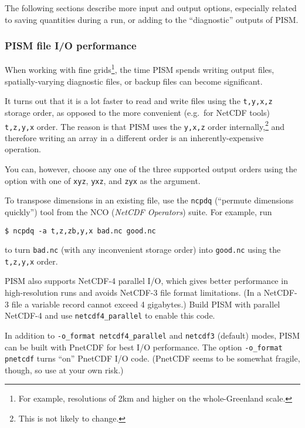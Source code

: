 The following sections describe more input and output options, especially related to saving quantities during a run, or adding to the ``diagnostic'' outputs of PISM.

\clearpage

\subsubsection{PISM file I/O performance}
\label{sec:pism-io-performance}

When working with fine grids\footnote{For example, resolutions of 2km and higher on the whole-Greenland scale.}, the time PISM spends writing output files, spatially-varying diagnostic files, or backup files can become significant.

It turns out that it is a lot faster to read and write files using the \texttt{t,y,x,z} storage order, as opposed to the more convenient (e.g.~for NetCDF tools) \texttt{t,z,y,x} order.  The reason is that PISM uses the \texttt{y,x,z} order internally,\footnote{This is not likely to change.} and therefore writing an array in a different order is an inherently-expensive operation.

You can, however, choose any one of the three supported output orders using the  option with one of \texttt{xyz}, \texttt{yxz}, and \texttt{zyx} as the argument.

To transpose dimensions in an existing file, use the \texttt{ncpdq} (``permute dimensions quickly'') tool from the NCO (\emph{NetCDF Operators}) suite.  For example, run
\begin{verbatim}
$ ncpdq -a t,z,zb,y,x bad.nc good.nc
\end{verbatim}
to turn \texttt{bad.nc} (with any inconvenient storage order) into \texttt{good.nc} using the \texttt{t,z,y,x} order.

PISM also supports NetCDF-4 parallel I/O, which gives better performance in
high-resolution runs and avoids NetCDF-3 file format limitations. (In a
NetCDF-3 file a variable record cannot exceed 4 gigabytes.) Build PISM with
parallel NetCDF-4 and use  \texttt{netcdf4_parallel} to
enable this code.

In addition to \texttt{-o_format netcdf4_parallel} and \texttt{netcdf3}
(default) modes, PISM can be built with PnetCDF for best I/O performance. The
option \texttt{-o_format pnetcdf} turns ``on'' PnetCDF I/O code. (PnetCDF seems
to be somewhat fragile, though, so use at your own risk.)


